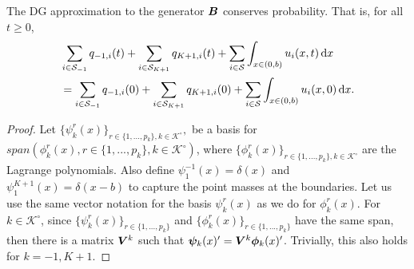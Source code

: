 \begin{cor}
	The DG approximation to the generator \(  \boldsymbol B\) conserves probability. That is, for all \(t\geq 0\), 
	\begin{align*}
	&\sum_{i\in\mathcal{S}_{-1}}q_{{-1},i}(t)+\sum_{i\in\mathcal{S}_{K+1}}q_{{K+1},i}(t)+\sum_{i\in\mathcal{S}} \int_{x\in(0,b)}u_i(x,t)\, \mathrm{d} x 
	\\&= \sum_{i\in\mathcal{S}_{-1}}q_{{-1},i}(0)+\sum_{i\in\mathcal{S}_{K+1}}q_{{K+1},i}(0)+\sum_{i\in\mathcal{S}} \int_{x\in(0,b)}u_i(x,0)\, \mathrm{d} x.
	\end{align*}
\end{cor}
\begin{proof}
Let \(\{\psi^r_k(x)\}_{r\in\{1,...,p_k\},k\in\mathcal K^\circ},\) be a basis for \(span(\phi^r_k(x),r\in\{1,...,p_k\},k\in\mathcal K^\circ)\), where \(\{\phi^r_k(x)\}_{r\in\{1,...,p_k\},k\in\mathcal K^\circ}\) are the Lagrange polynomials. Also define \(\psi_1^{-1}(x)=\delta(x)\) and \(\psi_1^{K+1}(x)=\delta(x-b)\) to capture the point masses at the boundaries. Let us use the same vector notation for the basis \(\psi^r_k(x)\) as we do for \(\phi^r_k(x)\). For \(k\in\mathcal K^\circ\), since \(\{\psi^r_k(x)\}_{r\in\{1,...,p_k\}}\) and \(\{\phi^r_k(x)\}_{r\in\{1,...,p_k\}}\) have the same span, then there is a matrix \(\boldsymbol V^k\) such that  \(\boldsymbol \psi_k(x)'{} = \boldsymbol V^k\boldsymbol \phi_k(x)'{}\). Trivially, this also holds for \(k={-1},{K+1}\). 


\end{proof}
